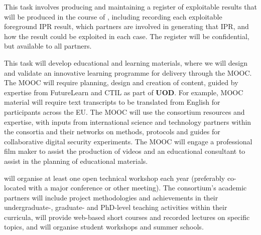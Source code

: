\begin{Workpackage}{\thewpno}
\begin{Task}
\TaskResults{%
\ref{del:dissemplan1};
\ref{del:dissemplan2}
}
\TaskHeader{}

This task involves producing and maintaining a register of exploitable results that will be produced in the course of \TheProject{}, including recording each exploitable foreground IPR result, which partners are involved in generating that IPR, and how the result could be exploited in each case.
The register will be confidential, but available to all partners.
\end{Task}

\begin{Task}


\TaskResults{%
\ref{del:mooc}
\ref{del:dissemplan3}
}
\TaskHeader{}

This task will develop educational and learning materials, where we will 
design and validate an innovative learning programme for delivery through the \TheProject{} MOOC. The MOOC will require planning, design and creation of content, guided by expertise from FutureLearn and CTIL as part of \textbf{UOD}.  For example, MOOC material will require 
 text transcripts to be translated from English for participants across the EU. The MOOC will use the \TheProject{}
consortium resources and expertise, with inputs from international science and technology partners within the \TheProject{}
consortia and their networks on methods, protocols and guides for collaborative digital security experiments.  The MOOC will engage a professional film maker to assist the production of videos and an educational consultant to assist in the planning of educational materials.

\TheProject{} will organise at least one open technical workshop each year
(preferably co-located with a major conference or other meeting).
The consortium's academic partners will include project methodologies and achievements in their undergraduate-, graduate- and PhD-level teaching activities within their curricula, will provide web-based short courses and recorded lectures on specific \TheProject topics, and will organise student workshops and summer schools.
\end{Task}


\end{Workpackage}

